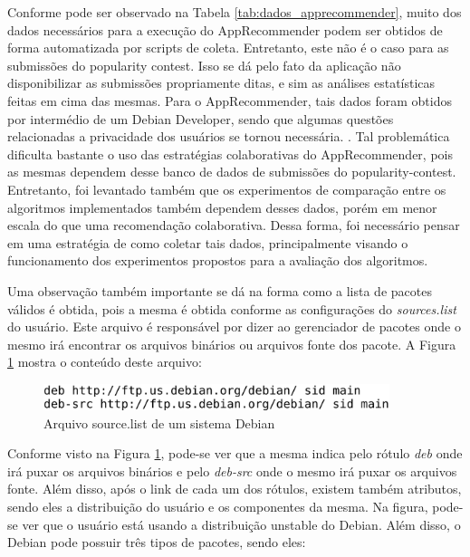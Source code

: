 Conforme pode ser observado na Tabela \ref{tab:dados_apprecommender}, muito dos dados
necessários para a execução do AppRecommender podem ser obtidos de forma automatizada
por scripts de coleta. Entretanto, este não é o caso para as submissões do
popularity contest. Isso se dá pelo fato da aplicação não disponibilizar as submissões
propriamente ditas, e sim as análises estatísticas feitas em cima das mesmas. Para o
AppRecommender, tais dados foram obtidos por intermédio de um Debian Developer, sendo
que algumas questões relacionadas a privacidade dos usuários se tornou necessária.
\cite{araujo2011apprecommender}. Tal problemática dificulta bastante o uso das
estratégias colaborativas do AppRecommender, pois as mesmas dependem desse banco de dados
de submissões do popularity-contest. Entretanto, foi levantado também que os
experimentos de comparação entre os algoritmos implementados também dependem
desses dados, porém em menor escala do que uma recomendação colaborativa.
Dessa forma, foi necessário pensar em uma estratégia
de como coletar tais dados, principalmente visando o funcionamento dos experimentos propostos
para a avaliação dos algoritmos.

Uma observação também importante se dá na forma como a lista de pacotes válidos
é obtida, pois a mesma é obtida conforme as configurações do \textit{sources.list} do usuário. Este arquivo é responsável
por dizer ao gerenciador de pacotes onde o mesmo irá encontrar os arquivos binários ou
arquivos fonte dos pacote. A Figura \ref{fig:source_list} mostra o conteúdo deste arquivo:
\\

\begin{figure}[h]
  \centering
  \includegraphics[width=0.9\textwidth]{figuras/source_list.eps}
  \caption{Arquivo source.list de um sistema Debian}
  \label{fig:source_list}
\end{figure}

Conforme visto na Figura \ref{fig:source_list}, pode-se ver que a mesma indica
pelo rótulo \textit{deb} onde irá puxar os arquivos binários e pelo
\textit{deb-src} onde o mesmo irá puxar os arquivos fonte. Além disso, após o
link de cada um dos rótulos, existem também atributos, sendo eles a distribuição
do usuário e os componentes da mesma. Na figura, pode-se ver que o usuário está
usando a distribuição unstable do Debian. Além disso, o Debian pode possuir três
tipos de pacotes, sendo eles:

